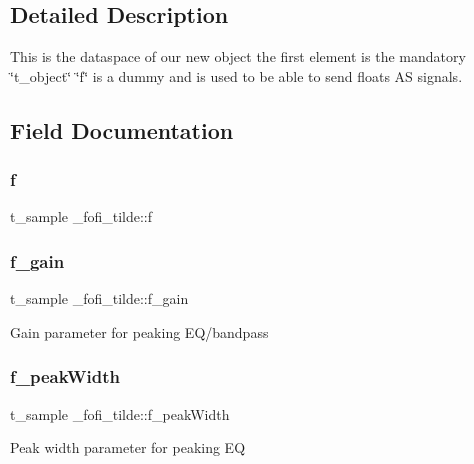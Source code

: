 \subsection{Detailed Description}
This is the dataspace of our new object the first element is the mandatory \char`\"{}t\+\_\+object\char`\"{} \char`\"{}f\char`\"{} is a dummy and is used to be able to send floats AS signals. 

\subsection{Field Documentation}
\mbox{\label{struct__fofi__tilde_ae59a31f6fe658e56a45e39ba4718cf47}} 
\subsubsection{\texorpdfstring{f}{f}}
{\footnotesize\ttfamily t\+\_\+sample \+\_\+fofi\+\_\+tilde\+::f}

\mbox{\label{struct__fofi__tilde_af4ec7786674213b45c30b547f0f2a2ba}} 
\subsubsection{\texorpdfstring{f\_gain}{f\_gain}}
{\footnotesize\ttfamily t\+\_\+sample \+\_\+fofi\+\_\+tilde\+::f\+\_\+gain}

Gain parameter for peaking E\+Q/bandpass \mbox{\label{struct__fofi__tilde_a7ffaace888f4bfdfc36150731c79fb98}} 
\subsubsection{\texorpdfstring{f\_peakWidth}{f\_peakWidth}}
{\footnotesize\ttfamily t\+\_\+sample \+\_\+fofi\+\_\+tilde\+::f\+\_\+peak\+Width}

Peak width parameter for peaking EQ \mbox{\label{struct__fofi__tilde_a7434f573cf65bb5167a3ee26ee485abf}} 
